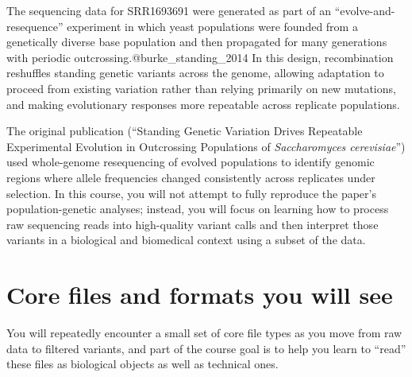 \documentclass[
  letterpaper,
  DIV=11,
  numbers=noendperiod]{scrreprt}
\begin{document}
The sequencing data for SRR1693691 were generated as part of an
``evolve-and-resequence'' experiment in which yeast populations were
founded from a genetically diverse base population and then propagated
for many generations with periodic outcrossing.@burke\_standing\_2014 In
this design, recombination reshuffles standing genetic variants across
the genome, allowing adaptation to proceed from existing variation
rather than relying primarily on new mutations, and making evolutionary
responses more repeatable across replicate populations.

The original publication (``Standing Genetic Variation Drives Repeatable
Experimental Evolution in Outcrossing Populations of \emph{Saccharomyces
cerevisiae}'') used whole-genome resequencing of evolved populations to
identify genomic regions where allele frequencies changed consistently
across replicates under selection. In this course, you will not attempt
to fully reproduce the paper's population-genetic analyses; instead, you
will focus on learning how to process raw sequencing reads into
high-quality variant calls and then interpret those variants in a
biological and biomedical context using a subset of the data.

\section{Core files and formats you will
see}\label{core-files-and-formats-you-will-see}

You will repeatedly encounter a small set of core file types as you move
from raw data to filtered variants, and part of the course goal is to
help you learn to ``read'' these files as biological objects as well as
technical ones.
\end{document}
